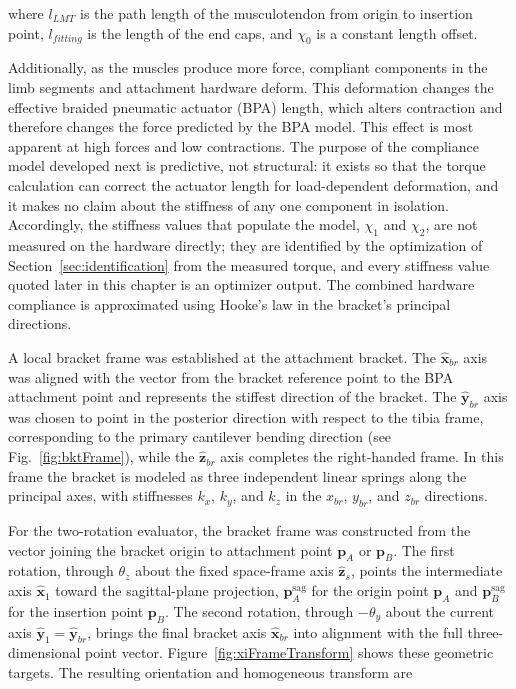 where $l_{LMT}$ is the path length of the musculotendon from origin to insertion point, $l_{fitting}$ is the length of the end caps, and $\chi_{0}$ is a constant length offset. 

Additionally, as the muscles produce more force, compliant components in the limb segments and attachment hardware deform. This deformation changes the effective braided pneumatic actuator (BPA) length, which alters contraction and therefore changes the force predicted by the BPA model. This effect is most apparent at high forces and low contractions. The purpose of the compliance model developed next is predictive, not structural: it exists so that the torque calculation can correct the actuator length for load-dependent deformation, and it makes no claim about the stiffness of any one component in isolation. Accordingly, the stiffness values that populate the model, $\chi_{1}$ and $\chi_{2}$, are not measured on the hardware directly; they are identified by the optimization of Section~\ref{sec:identification} from the measured torque, and every stiffness value quoted later in this chapter is an optimizer output. The combined hardware compliance is approximated using Hooke's law in the bracket's principal directions.

A local bracket frame was established at the attachment bracket. The $\hat{\mathbf{x}}_{br}$ axis was aligned with the vector from the bracket reference point to the BPA attachment point and represents the stiffest direction of the bracket. The $\hat{\mathbf{y}}_{br}$ axis was chosen to point in the posterior direction with respect to the tibia frame, corresponding to the primary cantilever bending direction (see Fig.~\ref{fig:bktFrame}), while the $\hat{\mathbf{z}}_{br}$ axis completes the right-handed frame. In this frame the bracket is modeled as three independent linear springs along the principal axes, with stiffnesses $k_{x}$, $k_{y}$, and $k_{z}$ in the $x_{br}$, $y_{br}$, and $z_{br}$ directions.

For the two-rotation evaluator, the bracket frame was constructed from the vector joining the bracket origin to attachment point $\mathbf{p}_{A}$ or $\mathbf{p}_{B}$. The first rotation, through $\theta_z$ about the fixed space-frame axis $\hat{\mathbf{z}}_{s}$, points the intermediate axis $\hat{\mathbf{x}}_{1}$ toward the sagittal-plane projection, $\mathbf{p}_{A}^{\mathrm{sag}}$ for the origin point $\mathbf{p}_{A}$ and $\mathbf{p}_{B}^{\mathrm{sag}}$ for the insertion point $\mathbf{p}_{B}$. The second rotation, through $-\theta_y$ about the current axis $\hat{\mathbf{y}}_{1}=\hat{\mathbf{y}}_{br}$, brings the final bracket axis $\hat{\mathbf{x}}_{br}$ into alignment with the full three-dimensional point vector. Figure~\ref{fig:xiFrameTransform} shows these geometric targets. The resulting orientation and homogeneous transform are

